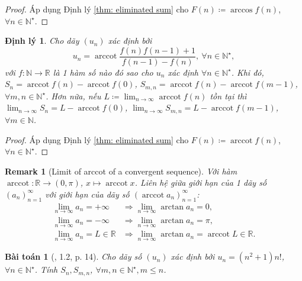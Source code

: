 \documentclass{article}
\newtheorem{baitoan}{Bài toán}
\newtheorem{dinhly}{Định lý}
\newtheorem{remark}{Remark}
\begin{document}
\begin{proof}
	Áp dụng Định lý \ref{thm: eliminated sum} cho $F(n)\coloneqq\arccos f(n)$, $\forall n\in\mathbb{N}^\star$.
\end{proof}

\begin{dinhly}
	Cho dãy $(u_n)$ xác định bởi
	\begin{equation*}
		u_n = \operatorname{arccot}\dfrac{f(n)f(n-1) + 1}{f(n-1) - f(n)},\ \forall n\in\mathbb{N}^\star,
	\end{equation*}
	với $f:\mathbb{N}\to\mathbb{R}$ là 1 hàm số nào đó sao cho $u_n$ xác định $\forall n\in\mathbb{N}^\star$. Khi đó, $S_n = \operatorname{arccot}f(n) - \operatorname{arccot}f(0)$, $S_{m,n} = \operatorname{arccot}f(n) - \operatorname{arccot}f(m - 1)$, $\forall m,n\in\mathbb{N}^\star$. Hơn nữa, nếu $L\coloneqq\lim_{n\to\infty} \operatorname{arccot}f(n)$ tồn tại thì $\lim_{n\to\infty} S_n = L - \operatorname{arccot}f(0)$, $\lim_{n\to\infty} S_{m,n} = L - \operatorname{arccot}f(m - 1)$, $\forall m\in\mathbb{N}$.
\end{dinhly}

\begin{proof}
	Áp dụng Định lý \ref{thm: eliminated sum} cho $F(n)\coloneqq\operatorname{arccot}f(n)$, $\forall n\in\mathbb{N}^\star$.
\end{proof}

\begin{remark}[Limit of arccot of a convergent sequence]
	Với hàm $\operatorname{arccot}:\mathbb{R}\to(0,\pi)$, $x\mapsto\operatorname{arccot}x$. Liên hệ giữa giới hạn của 1 dãy số $(a_n)_{n=1}^\infty$ với giới hạn của dãy số $(\operatorname{arccot}a_n)_{n=1}^\infty$:
	\begin{align*}
		\lim_{n\to\infty} a_n = +\infty&\Rightarrow\lim_{n\to\infty} \arctan a_n = 0,\\
		\lim_{n\to\infty} a_n = -\infty&\Rightarrow\lim_{n\to\infty} \arctan a_n = \pi,\\
		\lim_{n\to\infty} a_n = L\in\mathbb{R}&\Rightarrow\lim_{n\to\infty} \arctan a_n = \operatorname{arccot}L\in\mathbb{R}.
	\end{align*}
\end{remark}

\begin{baitoan}[\cite{Quoc_Long_Dat_Nam_VMC}, 1.2, p. 14]
	Cho dãy số $(u_n)$ xác định bởi $u_n = (n^2 + 1)n!$, $\forall n\in\mathbb{N}^\star$. Tính $S_n,S_{m,n}$, $\forall m,n\in\mathbb{N}^\star,m\le n$.
\end{baitoan}
\end{document}
